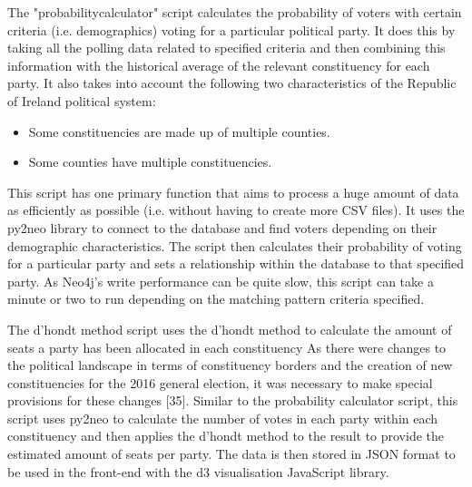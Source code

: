 The "probability\textunderscore calculator" script calculates the probability of voters with certain criteria (i.e. demographics) voting for a particular political party. It does this by taking all the polling data related to specified criteria and then combining this information with the historical average of the relevant constituency for each party.  It also takes into account the following two characteristics of the Republic of Ireland political system:
\begin{itemize}
	\item Some constituencies are made up of multiple counties.
	\item Some counties have multiple constituencies.
\end{itemize}
This script has one primary function that aims to process a huge amount of data as efficiently as possible (i.e. without having to create more CSV files). It uses the py2neo library to connect to the database and find voters depending on their demographic characteristics. The script then calculates their probability of voting for a particular party and sets a relationship within the database to that specified party. As Neo4j’s write performance can be quite slow, this script can take a minute or two to run depending on the matching pattern criteria specified.

The d’hondt method script uses the d’hondt method to calculate the amount of seats a party has been allocated in each constituency As there were changes to the political landscape in terms of constituency borders and the creation of new constituencies for the 2016 general election, it was necessary to make special provisions for these changes [35]. Similar to the probability calculator script, this script uses py2neo to calculate the number of votes in each party within each constituency and then applies the d’hondt method to the result to provide the estimated amount of seats per party. The data is then stored in JSON format to be used in the front-end with the d3 visualisation JavaScript library. 
\pagebreak


